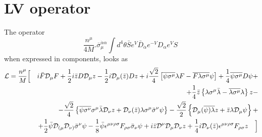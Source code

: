 \documentclass[a4paper,12pt]{article}
\begin{document}
\section{LV operator}
     The operator 
\[
  \frac{n^\mu} {4 M} 
    \bigl . \overline{\sigma}_\mu^{\dot{\alpha}\alpha}
   \int d^4 \theta \bar{S} e^V 
                  \bar{D}_{\dot{\alpha}} e^{-V} 
		  D_\alpha e^V S ~  
\]
    when expressed in components, looks as
\begin{eqnarray*}
{\mathcal L} & =  \frac{n^\mu}{M} \Bigl [&
  i \bar{F} \mathcal{D}_\mu F +
  \frac{1}{2} i \bar{z} D \mathcal{D}_\mu z - 
  \frac{1}{2} i \mathcal{D}_\mu(\bar{z}) D z + 
  i \frac{\sqrt{2}}{4} \left[
             \overline{\psi\sigma^\mu}\lambda F -
             \overline{F\lambda\sigma^\mu} \psi
                       \right] + 
  \frac{1}{4}\overline{\psi\sigma^\mu}D\psi + \\
&&  + \frac{1}{4} \bar{z} \left\{ 
               \lambda\sigma^\mu\bar{\lambda} -
               \overline{\lambda\sigma^\mu}\lambda 
                       \right\} z - \\
&& - \frac{\sqrt{2}}{4} \left\{ 
                      \overline{\psi\sigma^\nu}\sigma^\mu 
                     \bar{\lambda}\mathcal{D}_\nu z +
                     \mathcal{D}_\nu(\bar{z})\lambda\sigma^\mu
                     \bar{\sigma}^\nu \psi
                     \right \}
 - \frac{\sqrt{2}}{2} \left\{ 
                     \mathcal{D}_\mu(\overline{\psi)\lambda} z + 
                     \bar{z} \lambda \mathcal{D}_\mu \psi 
                     \right\} + \\
&& + \frac{1}{2}\bar{\psi}\mathcal{D}_{(\mu}\mathcal{D}_{\nu)}
               \bar{\sigma}^\nu \psi -
  \frac{1}{8} \bar{\psi}\epsilon^{\mu\nu\rho\sigma}
              F_{\rho\sigma} \bar{\sigma}_\nu \psi +
  i \bar{z} \mathcal{D}^\nu \mathcal{D}_\mu \mathcal{D}_\nu z +
  \frac{1}{4} i \mathcal{D}_\nu (\bar{z}) \epsilon^{\mu\nu\rho\sigma}
              F_{\rho\sigma} z~~~
                               \Bigr ] 
\end{eqnarray*}

\end{document}
